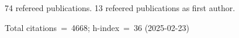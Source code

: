74 refereed publications. 13 refeered publications as first author.

Total citations~=~4668; h-index~=~36 (2025-02-23)